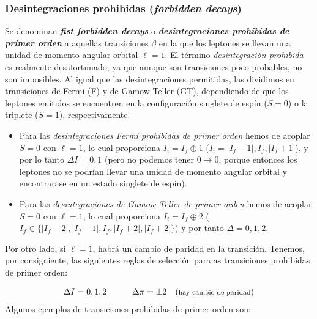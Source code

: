 \subsubsection{Desintegraciones prohibidas (\textit{forbidden decays})}

Se denominan \textit{\textbf{fist forbidden decays}} o \textit{\textbf{desintegraciones prohibidas de primer orden}} a aquellas transiciones $\beta$ en la que los leptones se llevan una unidad de momento angular orbital $\ell=1$. El término \textit{desintegración prohibida} es realmente desafortunado, ya que aunque son transiciones poco probables, no son imposibles. Al igual que las desintegraciones permitidas, las dividimos en transiciones de Fermi (F) y de Gamow-Teller (GT), dependiendo de que los leptones emitidos se encuentren en la configuración singlete de espín ($S=0$) o la triplete ($S=1$), respectivamente.



\begin{itemize}
	\item Para las \textit{desintegraciones Fermi prohibidas de primer orden} hemos de acoplar $S=0$ con $\ell=1$, lo cual proporciona $I_i = I_f\oplus 1$ ($I_i=|I_f-1|,I_f,|I_f+1|$), y por lo tanto $\Delta I = 0,1$ (pero no podemos tener $0\rightarrow 0$, porque entonces los leptones no se podrían llevar una unidad de momento angular orbital y encontrarase en un estado singlete de espín).
	
	\item Para las \textit{desintegraciones de Gamow-Teller de primer orden} hemos de acoplar $S=0$ con $\ell=1$, lo cual proporciona $I_i=I_f\oplus 2$ ($I_f\in \{ |I_f-2|,|I_f-1|,I_f,|I_f+2|,|I_f+2| \}$) y por tanto $\Delta =0,1,2$. 
\end{itemize}

Por otro lado, si $\ell=1$, habrá un cambio de paridad en la transición. Tenemos, por consiguiente, las siguientes reglas de selección para as transiciones prohibidas de primer orden:

\begin{eqnarray}
	\Delta I = 0,1,2 \quad \quad \quad \Delta \pi = \pm 2 \quad (\text{{\footnotesize  hay cambio de paridad}})
\end{eqnarray}
Algunos ejemplos de transiciones prohibidas de primer orden son:

